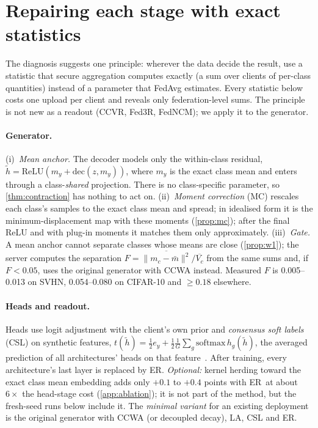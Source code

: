 \documentclass[10pt]{article}
\theoremstyle{plain}
\theoremstyle{definition}
\newcommand{\ER}{\textsc{ER}}
\begin{document}
\section{Repairing each stage with exact statistics}\label{sec:method}

The diagnosis suggests one principle: wherever the data decide the result, use a statistic that secure aggregation
computes exactly (a sum over clients of per-class quantities) instead of a parameter that FedAvg estimates. Every
statistic below costs one upload per client and reveals only federation-level sums. The principle is not new as a
readout (CCVR, Fed3R, FedNCM); we apply it to the generator.

\paragraph{Generator.} (i)~\emph{Mean anchor.} The decoder models only the within-class residual,
$\tilde h=\mathrm{ReLU}(m_y+\mathrm{dec}(z,m_y))$, where $m_y$ is the exact class mean and enters through a
class-\emph{shared} projection. There is no class-specific parameter, so \cref{thm:contraction} has nothing to act on.
(ii)~\emph{Moment correction} (MC) rescales each class's samples to the exact class mean and spread; in idealised form
it is the minimum-displacement map with these moments (\cref{prop:mc}); after the final ReLU and with plug-in moments it
matches them only approximately. (iii)~\emph{Gate.} A mean anchor cannot separate
classes whose means are close (\cref{prop:w1}); the server computes the separation
$F=\overline{\|m_c-\bar m\|^2}/\overline{V_c}$ from the same sums and, if $F<0.05$, uses the original generator with
CCWA instead. Measured $F$ is 0.005--0.013 on SVHN, 0.054--0.080 on CIFAR-10 and $\ge0.18$ elsewhere.

\paragraph{Heads and readout.} Heads use logit adjustment with the client's own prior and \emph{consensus soft labels}
(CSL) on synthetic features, $t(\tilde h)=\frac12e_y+\frac12\frac1G\sum_g\mathrm{softmax}\,h_g(\tilde h)$, the
averaged prediction of all architectures' heads on that feature~\cite{menon2021distillation}. After training, every
architecture's last layer is replaced by \ER. \emph{Optional:} kernel herding toward the exact class mean
embedding adds only $+0.1$ to $+0.4$ points with \ER\ at about $6\times$ the head-stage cost (\cref{app:ablation}); it
is not part of the method, but the fresh-seed runs below include it. The \emph{minimal variant} for an existing deployment is the original
generator with CCWA (or decoupled decay), LA, CSL and \ER.
\end{document}
